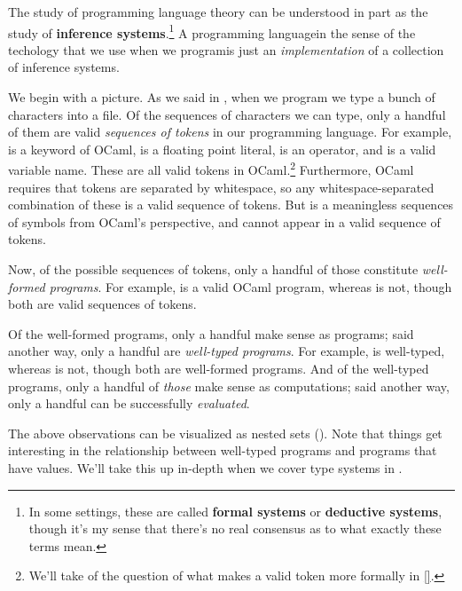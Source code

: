 The study of programming language theory can be understood in part as the study of \textbf{inference systems}.\footnote{
  In some settings, these are called \textbf{formal systems} or \textbf{deductive systems}, though it's my sense that there's no real consensus as to what exactly these terms mean.
}
A programming language\textemdash in the sense of the techology that we use when we program\textemdash is just an \textit{implementation} of a collection of inference systems.

We begin with a picture.
As we said in , when we program we type a bunch of characters into a file.
Of the sequences of characters we can type, only a handful of them are valid \textit{sequences of tokens} in our programming language.
For example,  is a keyword of OCaml,  is a floating point literal, \codel{+} is an operator, and  is a valid variable name.
These are all valid tokens in OCaml.\footnote{We'll take of the question of what makes a valid token more formally in \ref{}.}
Furthermore, OCaml requires that tokens are separated by whitespace, so any whitespace-separated combination of these is a valid sequence of tokens.
But  is a meaningless sequences of symbols from OCaml's perspective, and cannot appear in a valid sequence of tokens.

Now, of the possible sequences of tokens, only a handful of those constitute \textit{well-formed programs}.
For example,  is a valid OCaml program, whereas  is not, though both are valid sequences of tokens.

Of the well-formed programs, only a handful make sense as programs; said another way, only a handful are \textit{well-typed programs}.
For example,  is well-typed, whereas  is not, though both are well-formed programs.
And of the well-typed programs, only a handful of \textit{those} make sense as computations; said another way, only a handful can be successfully \textit{evaluated}.

The above observations can be visualized as nested sets ().
Note that things get interesting in the relationship between well-typed programs and programs that have values.
We'll take this up in-depth when we cover type systems in .

